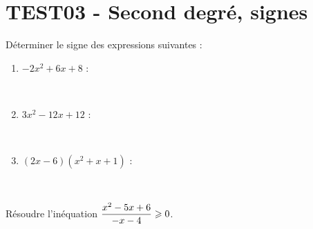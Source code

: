 \documentclass[a4paper,11pt]{article}
\author{Pierquet}
\title{\nomfichier}
\begin{document}
\pagestyle{fancy}

\part{TEST03 - Second degré, signes}

\setcounter{numexos}{0}

\medskip

\nomprenomtcbox

\medskip

\exonum{}

\medskip

Déterminer le signe des expressions suivantes :
%
\begin{enumerate}
	\item $-2x^2+6x+8$ :
	
	\medskip
	
	~~~~
	\item $3x^2-12x+12$ :
	
	\medskip
	
	~~~~
	\item $(2x-6)(x^2+x+1)$ :
	
	\medskip
	
	~~~~
\end{enumerate}

\smallskip

\exonum{}

\medskip

Résoudre l'inéquation $\dfrac{x^2-5x+6}{-x-4} \geqslant 0$.
%
\end{document}
